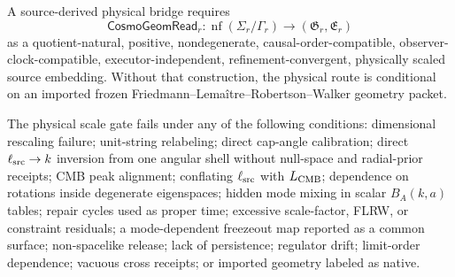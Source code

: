 \begin{target}\label{target:cosmo-geometry-extraction}
A source-derived physical bridge requires
\[
\mathsf{CosmoGeomRead}_r:\operatorname{nf}(\Sigma_r/\Gamma_r)
\to(\mathfrak G_r,\mathfrak E_r)
\]
as a quotient-natural, positive, nondegenerate, causal-order-compatible, observer-clock-compatible,
executor-independent, refinement-convergent, physically scaled source embedding. Without that
construction, the physical route is conditional on an imported frozen
Friedmann--Lema\^itre--Robertson--Walker geometry packet.
\end{target}

\begin{target}[falsifiers]\label{target:physical-scale-falsifiers}
The physical scale gate fails under any of the following conditions: dimensional rescaling failure;
unit-string relabeling; direct cap-angle calibration; direct \(\ell_{\rm src}\to k\) inversion from
one angular shell without null-space and radial-prior receipts; CMB peak alignment; conflating
\(\ell_{\rm src}\) with \(L_{\rm CMB}\); dependence on rotations inside degenerate eigenspaces;
hidden mode mixing in scalar \(B_A(k,a)\) tables; repair cycles used as proper time; excessive
scale-factor, FLRW, or constraint residuals; a mode-dependent freezeout map reported as a common
surface; non-spacelike release; lack of persistence; regulator drift; limit-order dependence;
vacuous cross receipts; or imported geometry labeled as native.
\end{target}
